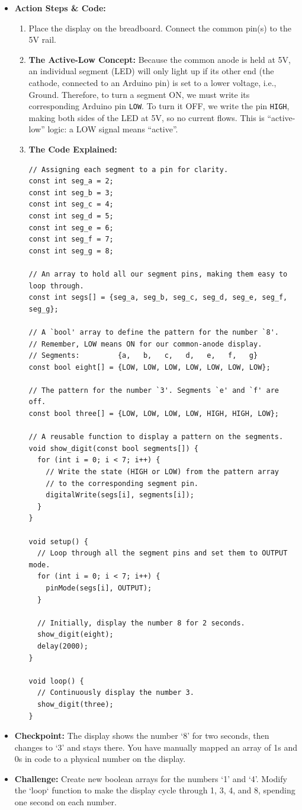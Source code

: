 \documentclass[11pt,a4paper]{article}
\begin{document}
\begin{itemize}
    \item \textbf{Action Steps \& Code:}
    \begin{enumerate}[label=\arabic*.]
        \item Place the display on the breadboard. Connect the common pin(s) to the 5V rail.
        \item \textbf{The Active-Low Concept:} Because the common anode is held at 5V, an individual segment (LED) will only light up if its other end (the cathode, connected to an Arduino pin) is set to a lower voltage, i.e., Ground. Therefore, to turn a segment ON, we must write its corresponding Arduino pin \verb|LOW|. To turn it OFF, we write the pin \verb|HIGH|, making both sides of the LED at 5V, so no current flows. This is ``active-low'' logic: a LOW signal means ``active''.
        \item \textbf{The Code Explained:}
\begin{lstlisting}[caption={Code for Module 1.3: Driving a 7-Segment Display}]
// Assigning each segment to a pin for clarity.
const int seg_a = 2;
const int seg_b = 3;
const int seg_c = 4;
const int seg_d = 5;
const int seg_e = 6;
const int seg_f = 7;
const int seg_g = 8;

// An array to hold all our segment pins, making them easy to loop through.
const int segs[] = {seg_a, seg_b, seg_c, seg_d, seg_e, seg_f, seg_g};

// A `bool' array to define the pattern for the number `8'.
// Remember, LOW means ON for our common-anode display.
// Segments:         {a,   b,   c,   d,   e,   f,   g}
const bool eight[] = {LOW, LOW, LOW, LOW, LOW, LOW, LOW};

// The pattern for the number `3'. Segments `e' and `f' are off.
const bool three[] = {LOW, LOW, LOW, LOW, HIGH, HIGH, LOW};

// A reusable function to display a pattern on the segments.
void show_digit(const bool segments[]) {
  for (int i = 0; i < 7; i++) {
    // Write the state (HIGH or LOW) from the pattern array
    // to the corresponding segment pin.
    digitalWrite(segs[i], segments[i]);
  }
}

void setup() {
  // Loop through all the segment pins and set them to OUTPUT mode.
  for (int i = 0; i < 7; i++) {
    pinMode(segs[i], OUTPUT);
  }

  // Initially, display the number 8 for 2 seconds.
  show_digit(eight);
  delay(2000);
}

void loop() {
  // Continuously display the number 3.
  show_digit(three);
}
\end{lstlisting}
    \end{enumerate}
    \item \textbf{Checkpoint:} The display shows the number `8' for two seconds, then changes to `3' and stays there. You have manually mapped an array of 1s and 0s in code to a physical number on the display.
    \item \textbf{Challenge:} Create new boolean arrays for the numbers `1' and `4'. Modify the `loop` function to make the display cycle through 1, 3, 4, and 8, spending one second on each number.
\end{itemize}
\end{document}
